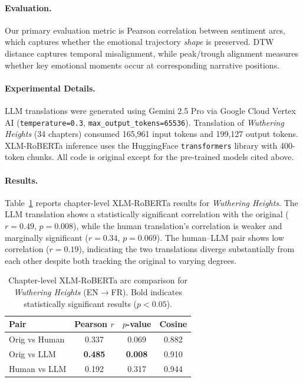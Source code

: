 \documentclass[11pt,a4paper]{article}
\begin{document}
\paragraph{Evaluation.}
Our primary evaluation metric is Pearson correlation between sentiment arcs, which captures whether the emotional trajectory \textit{shape} is preserved.
DTW distance captures temporal misalignment, while peak/trough alignment measures whether key emotional moments occur at corresponding narrative positions.

\paragraph{Experimental Details.}
LLM translations were generated using Gemini 2.5 Pro via Google Cloud Vertex AI (\texttt{temperature=0.3}, \texttt{max\_output\_tokens=65536}).
Translation of \textit{Wuthering Heights} (34 chapters) consumed 165{,}961 input tokens and 199{,}127 output tokens.
XLM-RoBERTa inference uses the HuggingFace \texttt{transformers} library with 400-token chunks.
All code is original except for the pre-trained models cited above.

\paragraph{Results.}
Table~\ref{tab:results} reports chapter-level XLM-RoBERTa results for \textit{Wuthering Heights}.
The LLM translation shows a statistically significant correlation with the original ($r{=}0.49$, $p{=}0.008$), while the human translation's correlation is weaker and marginally significant ($r{=}0.34$, $p{=}0.069$).
The human--LLM pair shows low correlation ($r{=}0.19$), indicating the two translations diverge substantially from each other despite both tracking the original to varying degrees.

\begin{table}[h]
\centering
\small
\begin{tabular}{lccc}
\toprule
\textbf{Pair} & \textbf{Pearson $r$} & \textbf{$p$-value} & \textbf{Cosine} \\
\midrule
Orig vs Human  & 0.337 & 0.069 & 0.882 \\
Orig vs LLM    & \textbf{0.485} & \textbf{0.008} & 0.910 \\
Human vs LLM   & 0.192 & 0.317 & 0.944 \\
\bottomrule
\end{tabular}
\caption{Chapter-level XLM-RoBERTa arc comparison for \textit{Wuthering Heights} (EN$\to$FR). Bold indicates statistically significant results ($p < 0.05$).}
\label{tab:results}
\end{table}
\end{document}
